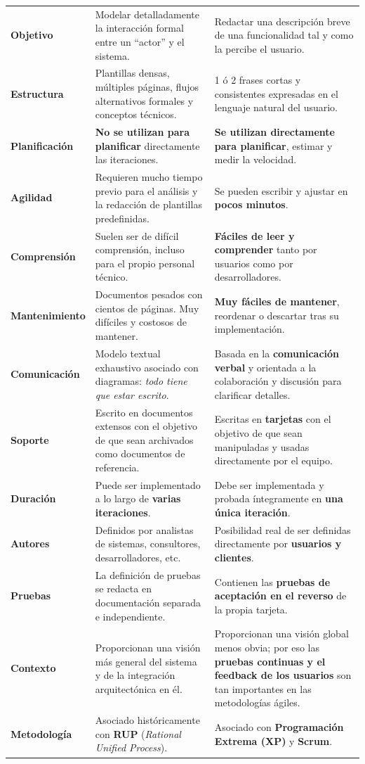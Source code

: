 \begin{longtable}{>{\bfseries\sffamily\color{mdaDarkBlue}}p{2.8cm} p{5.7cm} p{5.7cm}}
Objetivo & Modelar detalladamente la interacción formal entre un ``actor'' y el sistema. & Redactar una descripción breve de una funcionalidad tal y como la percibe el usuario. \\
\rowcolor{mdaGray}
Estructura & Plantillas densas, múltiples páginas, flujos alternativos formales y conceptos técnicos. & 1 ó 2 frases cortas y consistentes expresadas en el lenguaje natural del usuario. \\
Planificación & \textbf{No se utilizan para planificar} directamente las iteraciones. & \textbf{Se utilizan directamente para planificar}, estimar y medir la velocidad. \\
\rowcolor{mdaGray}
Agilidad & Requieren mucho tiempo previo para el análisis y la redacción de plantillas predefinidas. & Se pueden escribir y ajustar en \textbf{pocos minutos}. \\
Comprensión & Suelen ser de difícil comprensión, incluso para el propio personal técnico. & \textbf{Fáciles de leer y comprender} tanto por usuarios como por desarrolladores. \\
\rowcolor{mdaGray}
Mantenimiento & Documentos pesados con cientos de páginas. Muy difíciles y costosos de mantener. & \textbf{Muy fáciles de mantener}, reordenar o descartar tras su implementación. \\
Comunicación & Modelo textual exhaustivo asociado con diagramas: \textit{todo tiene que estar escrito}. & Basada en la \textbf{comunicación verbal} y orientada a la colaboración y discusión para clarificar detalles. \\
\rowcolor{mdaGray}
Soporte & Escrito en documentos extensos con el objetivo de que sean archivados como documentos de referencia. & Escritas en \textbf{tarjetas} con el objetivo de que sean manipuladas y usadas directamente por el equipo. \\
Duración & Puede ser implementado a lo largo de \textbf{varias iteraciones}. & Debe ser implementada y probada íntegramente en \textbf{una única iteración}. \\
\rowcolor{mdaGray}
Autores & Definidos por analistas de sistemas, consultores, desarrolladores, etc. & Posibilidad real de ser definidas directamente por \textbf{usuarios y clientes}. \\
Pruebas & La definición de pruebas se redacta en documentación separada e independiente. & Contienen las \textbf{pruebas de aceptación en el reverso} de la propia tarjeta. \\
\rowcolor{mdaGray}
Contexto & Proporcionan una visión más general del sistema y de la integración arquitectónica en él. & Proporcionan una visión global menos obvia; por eso las \textbf{pruebas continuas y el feedback de los usuarios} son tan importantes en las metodologías ágiles. \\
Metodología & Asociado históricamente con \textbf{RUP} (\textit{Rational Unified Process}). & Asociado con \textbf{Programación Extrema (XP)} y \textbf{Scrum}. \\
\end{longtable}
\renewcommand{\arraystretch}{1.0}

